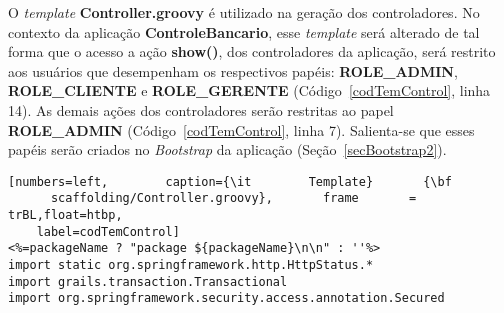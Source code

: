 O   {\it  template}  {\bf   Controller.groovy}  é   utilizado  na   geração  dos
controladores.   No  contexto da  aplicação  {\bf  ControleBancario}, esse  {\it
  template} será  alterado de tal  forma que o  acesso a ação {\bf  show()}, dos
controladores  da  aplicação, será  restrito  aos  usuários  que desempenham  os
respectivos papéis: {\bf ROLE\_ADMIN}, {\bf ROLE\_CLIENTE} e {\bf ROLE\_GERENTE}
(Código~\ref{codTemControl}, linha 14). As  demais ações dos controladores serão
restritas   ao  papel   {\bf  ROLE\_ADMIN}   (Código~\ref{codTemControl},  linha
7). Salienta-se que  esses papéis serão criados no  {\it Bootstrap} da aplicação
(Seção~\ref{secBootstrap2}).

\begin{lstlisting}[numbers=left,        caption={\it        Template}       {\bf
      scaffolding/Controller.groovy},       frame       =       trBL,float=htbp,
    label=codTemControl] 
<%=packageName ? "package ${packageName}\n\n" : ''%>
import static org.springframework.http.HttpStatus.*
import grails.transaction.Transactional
import org.springframework.security.access.annotation.Secured


\end{lstlisting}

